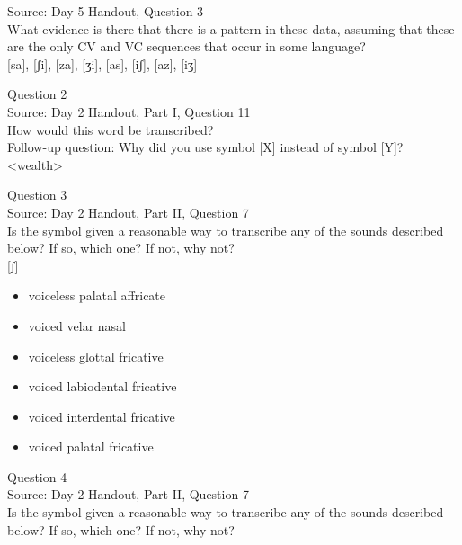 \documentclass[12pt]{article}
\begin{document}
Source: Day 5 Handout, Question 3\\

What evidence is there that there is a pattern in these data, assuming that these are the only CV and VC sequences that occur in some language?\\

{[sa]}, {[ʃi]}, {[za]}, {[ʒi]}, {[as]}, {[iʃ]}, {[az]}, {[iʒ]}


\newpage

{\large Question 2}\\

Source: Day 2 Handout, Part I, Question 11\\

How would this word be transcribed?\\ Follow-up question: Why did you use symbol [X] instead of symbol [Y]?\\

<wealth>


\newpage

{\large Question 3}\\

Source: Day 2 Handout, Part II, Question 7\\

Is the symbol given a reasonable way to transcribe any of the sounds described below? If so, which one? If not, why not?\\

{[ʃ]}

\begin{itemize} \item voiceless palatal affricate \item voiced velar nasal \item voiceless glottal fricative \item voiced labiodental fricative \item voiced interdental fricative \item voiced palatal fricative \end{itemize}


\newpage

{\large Question 4}\\

Source: Day 2 Handout, Part II, Question 7\\

Is the symbol given a reasonable way to transcribe any of the sounds described below? If so, which one? If not, why not?\\
\end{document}
